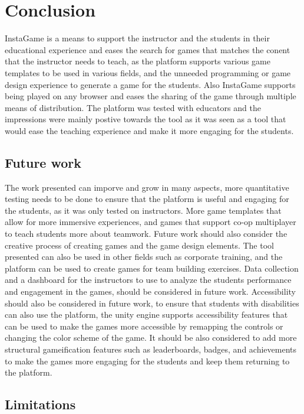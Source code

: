\chapter{Conclusion}\label{chap:concl}
InstaGame is a means to support the instructor and the students in their educational experience and eases the search for games that matches the conent that the instructor needs to teach, as the platform supports various game templates to be used in various fields, and the unneeded programming or game design experience to generate a game for the students. Also InstaGame supports being played on any browser and eases the sharing of the game through multiple means of distribution. The platform was tested with educators and the impressions were mainly postive towards the tool as it was seen as a tool that would ease the teaching experience and make it more engaging for the students. 
 
\section{Future work}

The work presented can imporve and grow in many aspects, more quantitative testing needs to be done to ensure that the platform is useful and engaging for the students, as it was only tested on instructors. More game templates that allow for more immersive experiences, and games that support co-op multiplayer to teach students more about teamwork. Future work should also consider the creative process of creating games and the game design elements. The tool presented can also be used in other fields such as corporate training, and the platform can be used to create games for team building exercises. Data collection and a dashboard for the instructors to use to analyze the students performance and engagement in the games, should be considered in future work. Accessibility should also be considered in future work, to ensure that students with disabilities can also use the platform, the unity engine supports accessibility features that can be used to make the games more accessible by remapping the controls or changing the color scheme of the game. It should be also considered to add more structural gameification features such as leaderboards, badges, and achievements to make the games more engaging for the students and keep them returning to the platform.

\section{Limitations}

